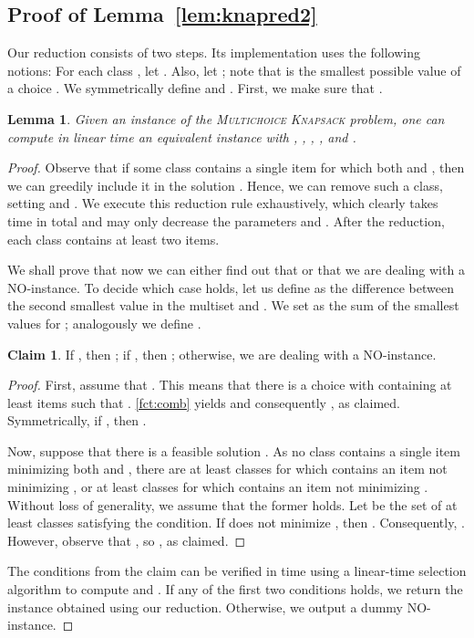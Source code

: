 \documentclass{article}
\theoremstyle{plain}
\newtheorem{lemma}[theorem]{Lemma}
\theoremstyle{definition}
\newtheorem*{claim}{Claim}
\newcommand{\MK}{\textsc{Multichoice Knapsack}\xspace}
\begin{document}
  \subsection{Proof of Lemma~\ref{lem:knapred2}}\label{ss}
  Our reduction consists of two steps.   Its implementation uses the following notions:
  For each class , let . Also, let ; note that  is the smallest possible value  of a choice .
  We symmetrically define  and .
  First, we make sure that .
  \begin{lemma}\label{lem:knapred}
    Given an instance  of the \MK problem, one can compute in linear time an equivalent instance  with , , , , and .
  \end{lemma}
  \begin{proof}   
    Observe that if some class  contains a single item  for which both 
    and , then we can greedily include it in the solution .  
    Hence, we can remove such a class, setting  and .
    We execute this reduction rule exhaustively, which clearly takes  time in total
    and may only decrease the parameters  and .
    After the reduction, each class contains at least two items.
    
    
    We shall prove that now we can either find out that  or 
    that we are dealing with a NO-instance.
    To decide which case holds, let us define  as the difference between the second smallest
    value in the multiset  and .
    We set  as the sum of the  smallest values 
    for ; analogously we define .
   
    \begin{claim}
      If , then ;
      if , then ;
      otherwise, we are dealing with a NO-instance.
    \end{claim}
    \begin{proof}
      First, assume that .
      This means that there is a choice  with  containing at least  items  such that .
      \cref{fct:comb} yields  and consequently , as claimed.
      Symmetrically, if , then .
   
      Now, suppose that there is a feasible solution .
      As no class contains a single item minimizing both  and , there are at least 
      classes for which  contains an item not minimizing , or at least  classes
      for which  contains an item not minimizing . Without loss of generality, we assume that the former holds.
      Let  be the set of at least  classes  satisfying the condition. 
      If  does not minimize , then . 
      Consequently, . 
      However, observe that ,
      so , as claimed.
    \end{proof}
   
    The conditions from the claim can be verified in  time using a linear-time selection algorithm to compute  and .
    If any of the first two conditions holds, we return the instance obtained using our reduction.
    Otherwise, we output a dummy NO-instance.
  \end{proof}
  
\end{document}
